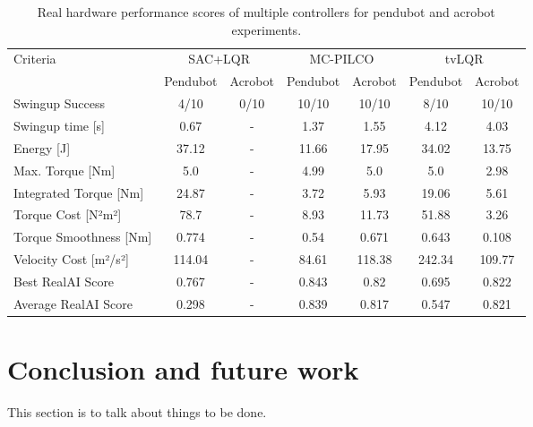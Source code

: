 \begin{table}[H]
  \centering
 \begin{tabular}{lcccccc}
 \hline
 Criteria & \multicolumn{2}{c}{SAC+LQR} & \multicolumn{2}{c}{MC-PILCO} & \multicolumn{2}{c}{tvLQR} \\
 & Pendubot & Acrobot & Pendubot & Acrobot & Pendubot & Acrobot \\
 \hline
 Swingup Success & 4/10 & 0/10 & 10/10 & 10/10 & 8/10 & 10/10 \\
 Swingup time [s] & 0.67 & - & 1.37 & 1.55 & 4.12 & 4.03 \\
 Energy [J] & 37.12 & - & 11.66 & 17.95 & 34.02 & 13.75 \\
 Max. Torque [Nm] & 5.0 & - & 4.99 & 5.0 & 5.0 & 2.98 \\
 Integrated Torque [Nm] & 24.87 & - & 3.72 & 5.93 & 19.06 & 5.61 \\
 Torque Cost [N²m²] & 78.7 & - & 8.93 & 11.73 & 51.88 & 3.26 \\
 Torque Smoothness [Nm] & 0.774 & - & 0.54 & 0.671 & 0.643 & 0.108 \\
 Velocity Cost [m²/s²] & 114.04 & - & 84.61 & 118.38 & 242.34 & 109.77 \\
 Best RealAI Score & 0.767 & - & 0.843 & 0.82 & 0.695 & 0.822 \\
 Average RealAI Score & 0.298 & - & 0.839 & 0.817 & 0.547 & 0.821 \\
 \hline
 \end{tabular}
 \caption{Real hardware performance scores of multiple controllers for pendubot and acrobot experiments.}
 \label{tab:performance}
\end{table}



\section{Conclusion and future work}
This section is to talk about things to be done.

\cleardoublepage
